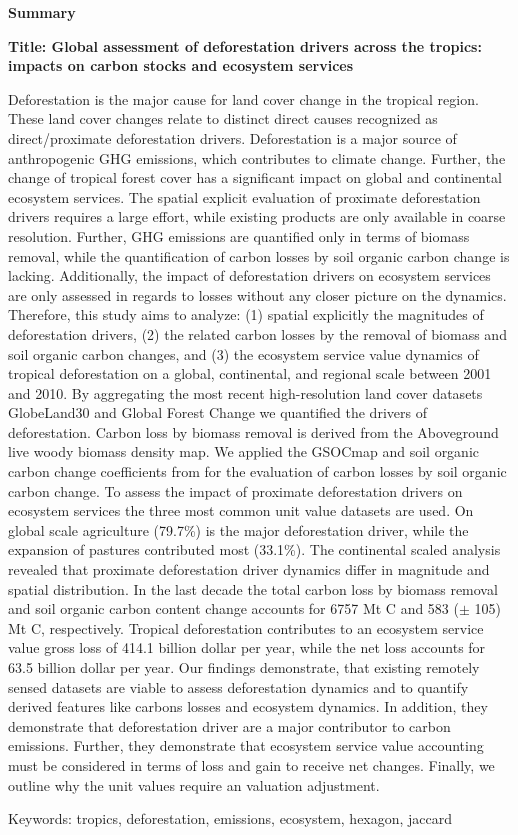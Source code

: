 \thispagestyle{empty}

\begin{center}
	\textbf{Summary}
\end{center}
	\textbf{Title: Global assessment of deforestation drivers across the tropics: impacts on carbon stocks and ecosystem services}

	Deforestation is the major cause for land cover change in the tropical region. These land cover changes relate to distinct direct causes recognized as direct/proximate deforestation drivers. Deforestation is a major source of anthropogenic \ac{GHG} emissions, which contributes to climate change. Further, the change of tropical forest cover has a significant impact on global and continental ecosystem services. The spatial explicit evaluation of proximate deforestation drivers requires a large effort, while existing products are only available in coarse resolution. Further, \ac{GHG} emissions are quantified only in terms of biomass removal, while the quantification of carbon losses by soil organic carbon change is lacking. Additionally, the impact of deforestation drivers on ecosystem services are only assessed in regards to losses without any closer picture on the dynamics. Therefore, this study aims to analyze: (1) spatial explicitly the magnitudes of deforestation drivers, (2) the related carbon losses by the removal of biomass and soil organic carbon changes, and (3) the ecosystem service value dynamics of tropical deforestation on a global, continental, and regional scale between 2001 and 2010. By aggregating the most recent high-resolution land cover datasets GlobeLand30 and Global Forest Change we quantified the drivers of deforestation. Carbon loss by biomass removal is derived from the Aboveground live woody biomass density map. We applied the GSOCmap and soil organic carbon change coefficients from \citet{Don2010} for the evaluation of carbon losses by soil organic carbon change. To assess the impact of proximate deforestation drivers on ecosystem services the three most common unit value datasets are used. On global scale agriculture (79.7\%) is the major deforestation driver, while the expansion of pastures contributed most (33.1\%). The continental scaled analysis revealed that proximate deforestation driver dynamics differ in magnitude and spatial distribution. In the last decade the total carbon loss by biomass removal and soil organic carbon content change accounts for 6757 Mt C and 583 ($\pm$ 105) Mt C, respectively. Tropical deforestation contributes to an ecosystem service value gross loss of 414.1 billion dollar per year, while the net loss accounts for 63.5 billion dollar per year. 
	Our findings demonstrate, that existing remotely sensed datasets are viable to assess deforestation dynamics and to quantify derived features like carbons losses and ecosystem dynamics. In addition, they demonstrate that deforestation driver are a major contributor to carbon emissions. Further, they demonstrate that ecosystem service value accounting must be considered in terms of loss and gain to receive net changes. Finally, we outline why the unit values require an valuation adjustment.

	Keywords: tropics, deforestation, emissions, ecosystem, hexagon, jaccard